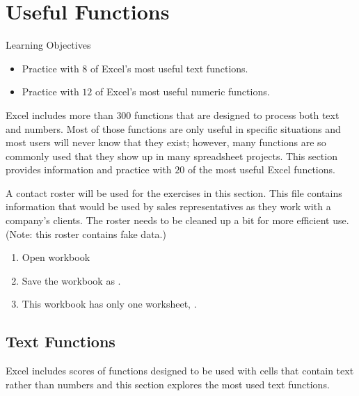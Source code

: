 \section{Useful Functions}

\begin{center}
	\begin{objbox}{Learning Objectives}
		\begin{itemize}
			\setlength{\itemsep}{0pt}
			\setlength{\parskip}{0pt}
			\setlength{\parsep}{0pt}
			
			\item Practice with $ 8 $ of Excel's most useful text functions.
			\item Practice with $ 12 $ of Excel's most useful numeric functions.
			
		\end{itemize}
	\end{objbox}
\end{center}

Excel includes more than $ 300 $ functions that are designed to process both text and numbers. Most of those functions are only useful in specific situations and most users will never know that they exist; however, many functions are so commonly used that they show up in many spreadsheet projects. This section provides information and practice with $ 20 $ of the most useful Excel functions.

A contact roster will be used for the exercises in this section. This file contains information that would be used by sales representatives as they work with a company's clients. The roster needs to be cleaned up a bit for more efficient use. (Note: this roster contains fake data.)

\begin{enumbox}
	\begin{enumerate}
		\item Open workbook 
		\item Save the workbook as .
		\item This workbook has only one worksheet, .
	\end{enumerate}
\end{enumbox}

\subsection{Text Functions}

Excel includes scores of functions designed to be used with cells that contain text rather than numbers and this section explores the most used text functions.

